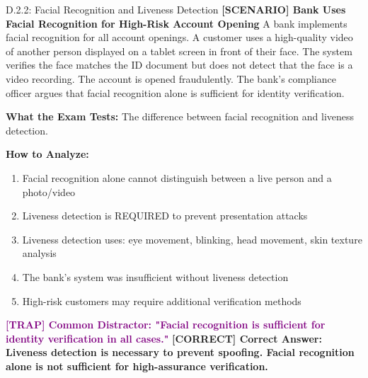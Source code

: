 \documentclass[11pt,a4paper]{beamer}
\newcommand{\trap}[1]{\textcolor{purple}{\textbf{[TRAP] #1}}}
\newcommand{\correct}[1]{\textcolor{green!50!black}{\textbf{[CORRECT] #1}}}
\newcommand{\scenario}[1]{\textcolor{blue!70!black}{\textbf{[SCENARIO] #1}}}
\begin{document}
\begin{frame}{D.2.2: Facial Recognition and Liveness Detection}
	\scenario{Bank Uses Facial Recognition for High-Risk Account Opening}
	A bank implements facial recognition for all account openings. A customer uses a high-quality video of another person displayed on a tablet screen in front of their face. The system verifies the face matches the ID document but does not detect that the face is a video recording. The account is opened fraudulently. The bank's compliance officer argues that facial recognition alone is sufficient for identity verification.
	
	\vspace{0.1cm}
	\textbf{What the Exam Tests:} The difference between facial recognition and liveness detection.
	
	\vspace{0.1cm}
	\textbf{How to Analyze:}
	\begin{enumerate}
		\item Facial recognition alone cannot distinguish between a live person and a photo/video
		\item Liveness detection is REQUIRED to prevent presentation attacks
		\item Liveness detection uses: eye movement, blinking, head movement, skin texture analysis
		\item The bank's system was insufficient without liveness detection
		\item High-risk customers may require additional verification methods
	\end{enumerate}
	
	\trap{Common Distractor: "Facial recognition is sufficient for identity verification in all cases."}
	\correct{Correct Answer: Liveness detection is necessary to prevent spoofing. Facial recognition alone is not sufficient for high-assurance verification.}
\end{frame}
\end{document}
